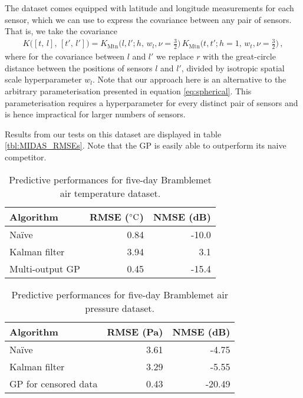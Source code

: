\documentclass{acmtrans2m}
\newcommand{\Kl}[1]{K_{\text{#1}}}
\begin{document}
The dataset comes equipped with latitude and longitude measurements for each sensor, which we can use to express the covariance between any pair of sensors. That is, we take the covariance
\begin{multline} \label{eq:MIDAS_cov}
 K\bigl([t,\,l],\,[t',\,l']\bigr)=
 \Kl{Mtn}\bigl(l,l';h,\,w_l,\nu=\tfrac{3}{2}\bigr)\,
\Kl{Mtn}\bigl(t,t';h=1,\,w_t,\nu=\tfrac{3}{2}\bigr)
\,,
\end{multline}
where for the covariance between $l$ and $l'$ we replace $r$ with the great-circle distance between the positions of sensors $l$ and $l'$, divided by isotropic spatial scale hyperparameter $w_l$. Note that our approach here is an alternative to the arbitrary parameterisation presented in equation \eqref{eq:spherical}. This parameterisation requires a hyperparameter for every distinct pair of sensors and is hence impractical for larger numbers of sensors.

Results from our tests on this dataset are displayed in table \ref{tbl:MIDAS_RMSEs}. Note that the GP is easily able to outperform its naive competitor.

\begin{table}
\centering
\caption{Predictive performances for five-day Bramblemet air temperature dataset.}
\label{tbl:AT_RMSEs}
 \begin{tabular}{@{}lrr@{}}
 \\
 \toprule
Algorithm & RMSE ($^\circ\text{C}$) & NMSE (dB)\\
\midrule
Na\"{i}ve & 0.84 & -10.0\\
Kalman filter & 3.94 & 3.1\\
Multi-output GP & 0.45 & -15.4\\
\bottomrule
\end{tabular}
\end{table}

\begin{table}
\centering
\caption{Predictive performances for five-day Bramblemet air pressure dataset.}
\label{tbl:AP_RMSEs}
 \begin{tabular}{@{}lrr@{}}
 \\
 \toprule
Algorithm & RMSE (Pa) & NMSE (dB)\\
\midrule
Na\"{i}ve & 3.61 & -4.75\\
Kalman filter & 3.29 & -5.55\\
GP for censored data & 0.43 & -20.49 \\
\bottomrule
\end{tabular}
\end{table}
\end{document}
